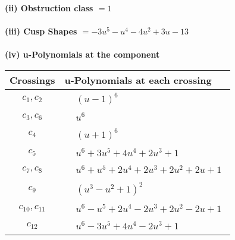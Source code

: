 \documentclass[1p]{elsarticle_modified}
\theoremstyle{definition}
\begin{document}
\flushleft \textbf{(ii) Obstruction class $= 1$}\\~\\
\flushleft \textbf{(iii) Cusp Shapes $= -3 u^5- u^4-4 u^2+3 u-13$}\\~\\
\newpage\renewcommand{\arraystretch}{1}
\flushleft \textbf{(iv) u-Polynomials at the component}\newline \\
\begin{tabular}{m{50pt}|m{274pt}}
Crossings & \hspace{64pt}u-Polynomials at each crossing \\
\hline $$\begin{aligned}c_{1},c_{2}\end{aligned}$$&$\begin{aligned}
&(u-1)^6
\end{aligned}$\\
\hline $$\begin{aligned}c_{3},c_{6}\end{aligned}$$&$\begin{aligned}
&u^6
\end{aligned}$\\
\hline $$\begin{aligned}c_{4}\end{aligned}$$&$\begin{aligned}
&(u+1)^6
\end{aligned}$\\
\hline $$\begin{aligned}c_{5}\end{aligned}$$&$\begin{aligned}
&u^6+3 u^5+4 u^4+2 u^3+1
\end{aligned}$\\
\hline $$\begin{aligned}c_{7},c_{8}\end{aligned}$$&$\begin{aligned}
&u^6+u^5+2 u^4+2 u^3+2 u^2+2 u+1
\end{aligned}$\\
\hline $$\begin{aligned}c_{9}\end{aligned}$$&$\begin{aligned}
&(u^3- u^2+1)^2
\end{aligned}$\\
\hline $$\begin{aligned}c_{10},c_{11}\end{aligned}$$&$\begin{aligned}
&u^6- u^5+2 u^4-2 u^3+2 u^2-2 u+1
\end{aligned}$\\
\hline $$\begin{aligned}c_{12}\end{aligned}$$&$\begin{aligned}
&u^6-3 u^5+4 u^4-2 u^3+1
\end{aligned}$\\
\hline
\end{tabular}\\~\\
\end{document}
